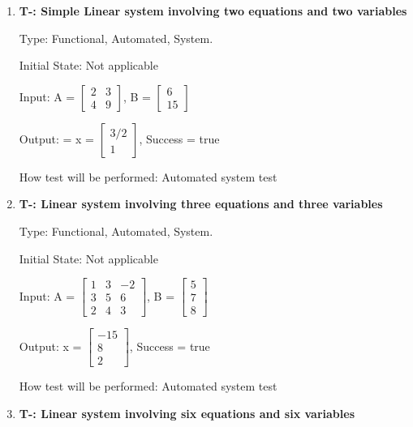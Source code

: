 \documentclass[12pt, titlepage]{article}
\newcounter{tnum}
\begin{document}
\begin{enumerate}

\item{\textbf{T-\thetnum \label{t-gauss elimination_simple}: Simple Linear system involving two equations and two variables}}


Type: Functional, Automated, System.
					
Initial State: Not applicable
					
Input: A = $\begin{bmatrix} 
2 & 3 \\
4 & 9 
\end{bmatrix}$, B = $\begin{bmatrix} 
6 \\
15 
\end{bmatrix}$

Output: = x = $\begin{bmatrix} 
3/2\\
1
\end{bmatrix}$, Success = true
					
How test will be performed: Automated system test
					
\item{\textbf{T-\thetnum \label{t-gaussian elimination_three}: Linear system involving three equations and three variables}}

Type: Functional, Automated, System.
					
Initial State: Not applicable
					
Input: A =  $\begin{bmatrix} 
1 & 3 & -2 \\
3 & 5 & 6\\
2 & 4 & 3
\end{bmatrix}$, B = $\begin{bmatrix} 
5\\
7\\
8 
\end{bmatrix}$
					
Output: x = $\begin{bmatrix} 
-15\\
8\\
2 
\end{bmatrix}$, Success = true
					
How test will be performed: Automated system test

\item{\textbf{T-\thetnum \label{t-gaussian elimination_five}: Linear system involving six equations and six variables}}


\end{enumerate}
\end{document}
